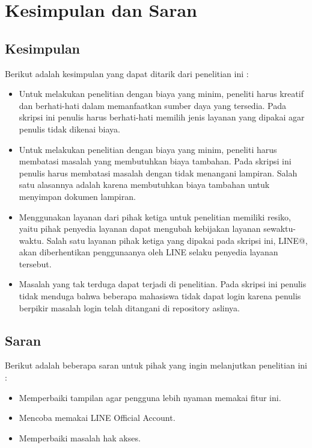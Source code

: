 \chapter{Kesimpulan dan Saran}
\section{Kesimpulan}
Berikut adalah kesimpulan yang dapat ditarik dari penelitian ini :
\begin{itemize}
\item Untuk melakukan penelitian dengan biaya yang minim, peneliti harus kreatif dan berhati-hati dalam memanfaatkan sumber daya yang tersedia. Pada skripsi ini penulis harus berhati-hati memilih jenis layanan yang dipakai agar penulis tidak dikenai biaya.
\item Untuk melakukan penelitian dengan biaya yang minim, peneliti harus membatasi masalah yang membutuhkan biaya tambahan. Pada skripsi ini penulis harus membatasi masalah dengan tidak menangani lampiran. Salah satu alasannya adalah karena membutuhkan biaya tambahan untuk menyimpan dokumen lampiran.
\item Menggunakan layanan dari pihak ketiga untuk penelitian memiliki resiko, yaitu pihak penyedia layanan dapat mengubah kebijakan layanan sewaktu-waktu. Salah satu layanan pihak ketiga yang dipakai pada skripsi ini, LINE@, akan diberhentikan penggunaanya oleh LINE selaku penyedia layanan tersebut.
\item Masalah yang tak terduga dapat terjadi di penelitian. Pada skripsi ini penulis tidak menduga bahwa beberapa mahasiswa tidak dapat login karena penulis berpikir masalah login telah ditangani di repository aslinya.
\end{itemize}

\section{Saran}
Berikut adalah beberapa saran untuk pihak yang ingin melanjutkan penelitian ini :
\begin{itemize}
\item Memperbaiki tampilan agar pengguna lebih nyaman memakai fitur ini.
\item Mencoba memakai LINE Official Account.
\item Memperbaiki masalah hak akses.
\end{itemize}